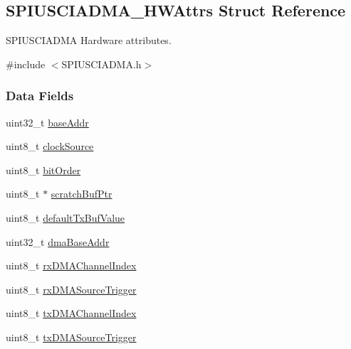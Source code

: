 \subsection{S\-P\-I\-U\-S\-C\-I\-A\-D\-M\-A\-\_\-\-H\-W\-Attrs Struct Reference}
\label{struct_s_p_i_u_s_c_i_a_d_m_a___h_w_attrs}


S\-P\-I\-U\-S\-C\-I\-A\-D\-M\-A Hardware attributes.  




{\ttfamily \#include $<$S\-P\-I\-U\-S\-C\-I\-A\-D\-M\-A.\-h$>$}

\subsubsection*{Data Fields}
\begin{DoxyCompactItemize}
\item 
uint32\-\_\-t \hyperlink{struct_s_p_i_u_s_c_i_a_d_m_a___h_w_attrs_a12d6702a8f9d28940b3c1a8791105fd1}{base\-Addr}
\item 
uint8\-\_\-t \hyperlink{struct_s_p_i_u_s_c_i_a_d_m_a___h_w_attrs_a3e3ce932f02b562c2c98c83569507366}{clock\-Source}
\item 
uint8\-\_\-t \hyperlink{struct_s_p_i_u_s_c_i_a_d_m_a___h_w_attrs_ae137848c8408f828aaa43cb2b65a4c76}{bit\-Order}
\item 
uint8\-\_\-t $\ast$ \hyperlink{struct_s_p_i_u_s_c_i_a_d_m_a___h_w_attrs_a30fb415f3106114da8afc19b70c716dd}{scratch\-Buf\-Ptr}
\item 
uint8\-\_\-t \hyperlink{struct_s_p_i_u_s_c_i_a_d_m_a___h_w_attrs_a478346310b98cd11b2f5374cfe79f318}{default\-Tx\-Buf\-Value}
\item 
uint32\-\_\-t \hyperlink{struct_s_p_i_u_s_c_i_a_d_m_a___h_w_attrs_a62c91e551da568fd08242752fc5f9e41}{dma\-Base\-Addr}
\item 
uint8\-\_\-t \hyperlink{struct_s_p_i_u_s_c_i_a_d_m_a___h_w_attrs_a53cfa5af49ab3d8c38b6ce1fecb8a74a}{rx\-D\-M\-A\-Channel\-Index}
\item 
uint8\-\_\-t \hyperlink{struct_s_p_i_u_s_c_i_a_d_m_a___h_w_attrs_a922449116abeccd41d6dfacde55b91ff}{rx\-D\-M\-A\-Source\-Trigger}
\item 
uint8\-\_\-t \hyperlink{struct_s_p_i_u_s_c_i_a_d_m_a___h_w_attrs_a6bc4ea22e196622d3cdcdcd2c0045551}{tx\-D\-M\-A\-Channel\-Index}
\item 
uint8\-\_\-t \hyperlink{struct_s_p_i_u_s_c_i_a_d_m_a___h_w_attrs_a1d2a5cd21e6ebcde08a6632b79c6231b}{tx\-D\-M\-A\-Source\-Trigger}
\end{DoxyCompactItemize}


